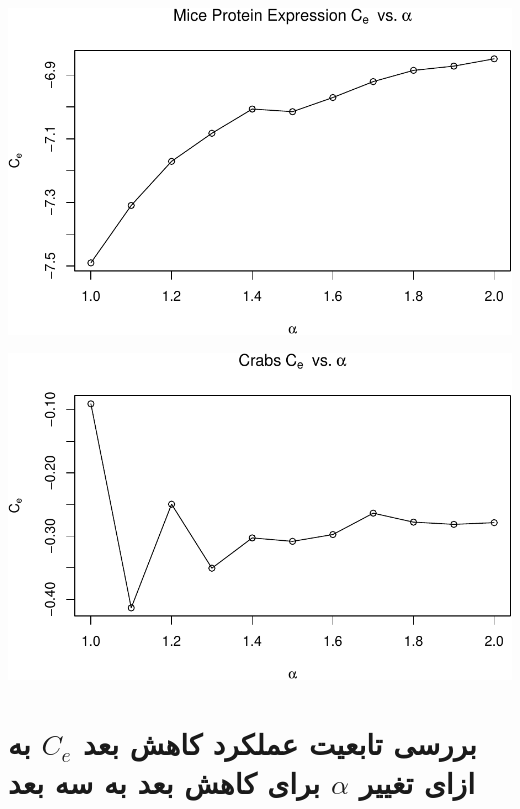 \begin{center}\includegraphics[width=1\linewidth]{Report_files/figure-latex/unnamed-chunk-20-6} \end{center}

\begin{center}\includegraphics[width=1\linewidth]{Report_files/figure-latex/unnamed-chunk-20-7} \end{center}



\section{
بررسی تابعیت عملکرد کاهش بعد $C_e$ به ازای تغییر $\alpha$ برای کاهش بعد به سه بعد
}



